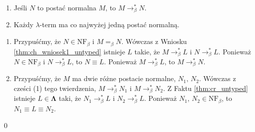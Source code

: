\begin{wniosek}\label{thm:ch_wniosek2_untyped}
  \begin{enumerate}[label={(\arabic*)}, ref={(\arabic*)}]
  \setlength\itemsep{0em}
  \item Jeśli \(N\) to postać normalna \(M\), to \(M\to^{*}_\beta N\).
  \item Każdy \(\lambda\)-term ma co najwyżej jedną postać normalną.
  \end{enumerate}
\end{wniosek}
\begin{dowod}
  \begin{enumerate}[label={(\arabic*)}, ref={(\arabic*)}]
  \setlength\itemsep{0em}
  \item Przypuśćmy, że \(N\in \mathrm{NF}_\beta\) i \(M=_\beta N\). Wówczas z Wniosku \ref{thm:ch_wniosek1_untyped} istnieje \(L\) takie, że \(M\to^{*}_\beta L\) i \(N\to^{*}_\beta L\). Ponieważ \(N\in \mathrm{NF}_\beta\) i \(N\to^{*}_\beta L\), to \(N\equiv L\). Ponieważ \(M\to^{*}_\beta L\), to \(M\to^{*}_\beta N\).
  \item Przypuśćmy, że \(M\) ma dwie różne postacie normalne, \(N_1,\, N_2\). Wówczas z cześci (1) tego twierdzenia, \(M\to^{*}_\beta N_1\) i \(M\to^{*}_\beta N_2\). Z Faktu \ref{thm:cr_untyped} istnieje \(L\in\mathbf{\Lambda}\) taki, że \(N_1 \to^{*}_\beta L\) i \(N_2 \to^{*}_\beta L\). Ponieważ \(N_1,\,N_2\in \mathrm{NF}_\beta\), to \(N_1\equiv L \equiv N_2\).
  \end{enumerate}
  \qed
\end{dowod}
